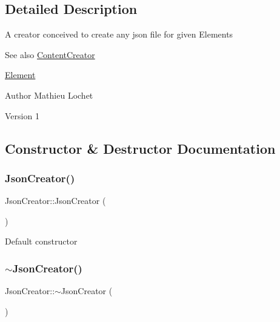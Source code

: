 \subsection{Detailed Description}
A creator conceived to create any json file for given Elements \begin{DoxySeeAlso}{See also}
\mbox{\hyperlink{classContentCreator}{Content\+Creator}} 

\mbox{\hyperlink{classElement}{Element}}
\end{DoxySeeAlso}
\begin{DoxyAuthor}{Author}
Mathieu Lochet 
\end{DoxyAuthor}
\begin{DoxyVersion}{Version}
1 
\end{DoxyVersion}


\subsection{Constructor \& Destructor Documentation}
\mbox{\label{classJsonCreator_a71197e5dafee7dd9c04c208413050860}} 
\subsubsection{\texorpdfstring{Json\+Creator()}{JsonCreator()}}
{\footnotesize\ttfamily Json\+Creator\+::\+Json\+Creator (\begin{DoxyParamCaption}{ }\end{DoxyParamCaption})\hspace{0.3cm}{\ttfamily [default]}}

Default constructor \mbox{\label{classJsonCreator_a061eaa469894ab51ae6c046016da9e40}} 
\subsubsection{\texorpdfstring{$\sim$\+Json\+Creator()}{~JsonCreator()}}
{\footnotesize\ttfamily Json\+Creator\+::$\sim$\+Json\+Creator (\begin{DoxyParamCaption}{ }\end{DoxyParamCaption})\hspace{0.3cm}{\ttfamily [default]}}

